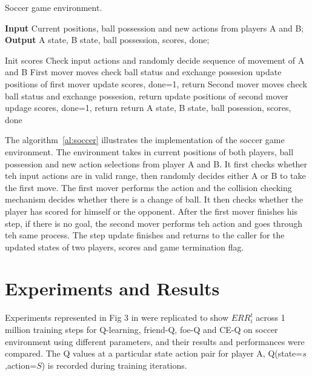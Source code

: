 \documentclass[conference]{IEEEtran}
\begin{document}
\begin{algorithm}[htb] 
\caption{Soccer game environment.} 
\textbf{Input} Current positions, ball possession and new actions from players A and B;\\
\textbf{Output} A state, B state, ball possession, scores, done;
\begin{algorithmic}[1]\label{al:soccer}
\STATE Init scores
\STATE Check input actions and randomly decide sequence of movement of A and B
\STATE First mover moves
\STATE check ball status and exchange possesion
\ELSE
\STATE update positions of first mover
       \STATE update scores, done=1, return
       \ENDIF
\ENDIF
\STATE Second mover moves
\STATE check ball status and exchange possesion, return
\ELSE
\STATE update positions of second mover
       \STATE updage scores, done=1, return
       \ENDIF
\ENDIF
return A state, B state, ball posession, scores, done
\end{algorithmic}
\end{algorithm}

The algorithm~\ref{al:soccer} illustrates the implementation of the soccer game environment. The environment takes in current positions of both players, ball possession and new action selections from player A and B. It first checks whether teh input actions are in valid range, then randomly decides either A or B to take the first move. The first mover performs the action and the collision checking mechanism decides whether there is a change of ball. It then checks whether the player has scored for himself or the opponent. After the first mover finishes his step, if there is no goal, the second mover performs teh action and goes through teh same process. The step update finishes and returns to the caller for the updated states of two players, scores and game termination flag.

\section{Experiments and Results}\label{sec:results}

Experiments represented in Fig 3 in \cite{b1} were replicated to show $ERR_i^t$ across 1 million training steps for Q-learning, friend-Q, foe-Q and CE-Q on soccer environment using different parameters, and their results and performances were compared. The Q values at a particular state action pair for player A, Q(state=$s$,action=$S$) is recorded during training iterations.
\end{document}
